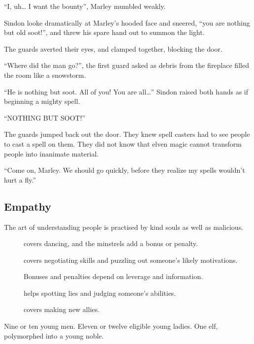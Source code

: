 \begin{multicols}{2}
\begin{exampletext}
  ``I, uh\ldots
  I want the bounty'', Marley mumbled weakly.

  Sindon looke dramatically at Marley's hooded face and sneered, ``you are nothing but old soot!'', and threw his spare hand out to summon the light.

  The guards averted their eyes, and clamped together, blocking the door.
  
  ``Where did the man go?'', the first guard asked as debris from the fireplace filled the room like a snowstorm.

  ``He is nothing but soot.
  All of you!
  You are all\ldots''
  Sindon raised both hands as if beginning a mighty spell.

  ``NOTHING BUT SOOT!''

  The guards jumped back out the door.
  They knew spell casters had to see people to cast a spell on them.
  They did not know that elven magic cannot transform people into inanimate material.

  ``Come on, Marley.
  We should go quickly, before they realize my spells wouldn't hurt a fly.''

\end{exampletext}

\subsection{Empathy}

The art of understanding people is practised by kind souls as well as malicious.

\begin{description}
  \item[]
    covers dancing, and the minstrels add a bonus or penalty.
  \item[]
    covers negotiating skills and puzzling out someone's likely motivations.

    Bonuses and penalties depend on leverage and information.
  \item[]
    helps spotting lies and judging someone's abilities.
  \item[]
    covers making new allies.
\end{description}

\begin{exampletext}
  Nine or ten young men.
  Eleven or twelve eligible young ladies.
  One elf, polymorphed into a young noble.


\end{exampletext}
\end{multicols}
